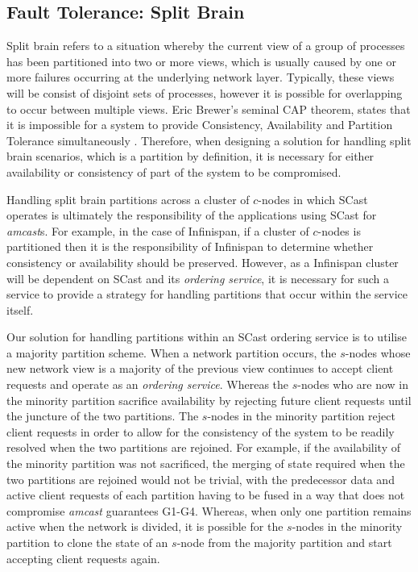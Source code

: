     \subsection{Fault Tolerance: Split Brain}
    Split brain refers to a situation whereby the current view of a group of processes has been partitioned into two or more views, which is usually caused by one or more failures occurring at the underlying network layer. Typically, these views will be consist of disjoint sets of processes, however it is possible for overlapping to occur between multiple views.  Eric Brewer's seminal CAP theorem, states that it is impossible for a system to provide Consistency, Availability and Partition Tolerance simultaneously \citep{Brewer:2000:TRD:343477.343502,6133253, Gilbert:2002:BCF:564585.564601}.  Therefore, when designing a solution for handling split brain scenarios, which is a partition by definition, it is necessary for either availability or consistency of part of the system to be compromised.  
    
    Handling split brain partitions across a cluster of $c$-nodes in which \textsf{SCast} operates is ultimately the responsibility of the applications using \textsf{SCast} for \emph{amcast}s.  For example, in the case of Infinispan, if a cluster of $c$-nodes is partitioned then it is the responsibility of Infinispan to determine whether consistency or availability should be preserved.  However, as a Infinispan cluster will be dependent on \textsf{SCast} and its \emph{ordering service}, it is necessary for such a service to provide a strategy for handling partitions that occur within the service itself.  
    
    Our solution for handling partitions within an \textsf{SCast} ordering service is to utilise a majority partition scheme.  When a network partition occurs, the $s$-nodes whose new network view is a majority of the previous view continues to accept client requests and operate as an \emph{ordering service}.  Whereas the $s$-nodes who are now in the minority partition sacrifice availability by rejecting future client requests until the juncture of the two partitions.  The $s$-nodes in the minority partition reject client requests in order to allow for the consistency of the system to be readily resolved when the two partitions are rejoined.  For example, if the availability of the minority partition was not sacrificed, the merging of state required when the two partitions are rejoined would not be trivial, with the predecessor data and active client requests of each partition having to be fused in a way that does not compromise \emph{amcast} guarantees G1-G4.  Whereas, when only one partition remains active when the network is divided, it is possible for the $s$-nodes in the minority partition to clone the state of an $s$-node from the majority partition and start accepting client requests again.  
    
